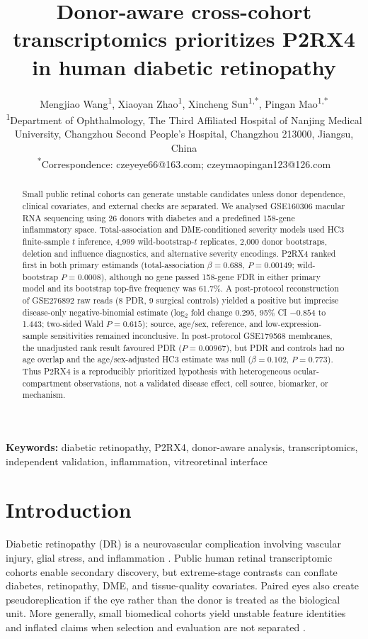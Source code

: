 \documentclass[12pt]{article}
\title{Donor-aware cross-cohort transcriptomics prioritizes P2RX4 in human diabetic retinopathy}
\author{\parbox{0.88\textwidth}{\centering
Mengjiao Wang\textsuperscript{1}, Xiaoyan Zhao\textsuperscript{1}, Xincheng Sun\textsuperscript{1,*}, Pingan Mao\textsuperscript{1,*}\\[6pt]
\normalsize\textsuperscript{1}Department of Ophthalmology, The Third Affiliated Hospital of Nanjing Medical University, Changzhou Second People's Hospital, Changzhou 213000, Jiangsu, China\\[6pt]
\normalsize\textsuperscript{*}Correspondence: czeyeye66@163.com; czeymaopingan123@126.com}}
\date{}
\newcommand{\keywords}[1]{\par\noindent\textbf{Keywords:} #1}
\begin{document}
\maketitle

\begin{abstract}
Small public retinal cohorts can generate unstable candidates unless donor dependence, clinical covariates, and external checks are separated. We analysed GSE160306 macular RNA sequencing using 26 donors with diabetes and a predefined 158-gene inflammatory space. Total-association and DME-conditioned severity models used HC3 finite-sample $t$ inference, 4,999 wild-bootstrap-$t$ replicates, 2,000 donor bootstraps, deletion and influence diagnostics, and alternative severity encodings. P2RX4 ranked first in both primary estimands (total-association $\beta=0.688$, $P=0.00149$; wild-bootstrap $P=0.0008$), although no gene passed 158-gene FDR in either primary model and its bootstrap top-five frequency was 61.7\%. A post-protocol reconstruction of GSE276892 raw reads (8 PDR, 9 surgical controls) yielded a positive but imprecise disease-only negative-binomial estimate (log$_2$ fold change 0.295, 95\% CI $-0.854$ to 1.443; two-sided Wald $P=0.615$); source, age/sex, reference, and low-expression-sample sensitivities remained inconclusive. In post-protocol GSE179568 membranes, the unadjusted rank result favoured PDR ($P=0.00967$), but PDR and controls had no age overlap and the age/sex-adjusted HC3 estimate was null ($\beta=0.102$, $P=0.773$). Thus P2RX4 is a reproducibly prioritized hypothesis with heterogeneous ocular-compartment observations, not a validated disease effect, cell source, biomarker, or mechanism.
\end{abstract}

\keywords{diabetic retinopathy, P2RX4, donor-aware analysis, transcriptomics, independent validation, inflammation, vitreoretinal interface}

\section{Introduction}

Diabetic retinopathy (DR) is a neurovascular complication involving vascular injury, glial stress, and inflammation \citep{Cheung2010,Yau2012,Forrester2020}. Public human retinal transcriptomic cohorts enable secondary discovery, but extreme-stage contrasts can conflate diabetes, retinopathy, DME, and tissue-quality covariates. Paired eyes also create pseudoreplication if the eye rather than the donor is treated as the biological unit. More generally, small biomedical cohorts yield unstable feature identities and inflated claims when selection and evaluation are not separated \citep{Rosenblatt2024,Bernett2024}.
\end{document}
